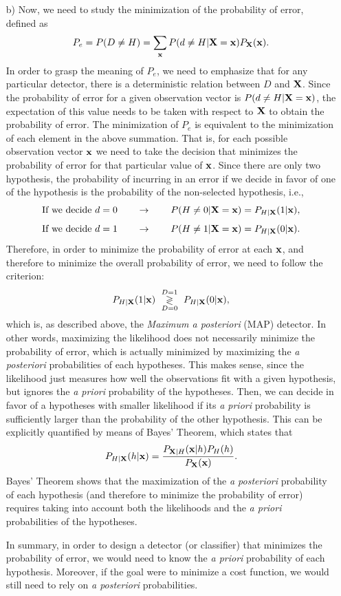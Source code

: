 \begin{solution}
\begin{itemize}
		\item[b)] Now, we need to study the minimization of the probability of error, defined as
		$$P_e = P(D\neq H) = \sum_{\bf x} P(d\neq H | {\bf X}={\bf x}) P_{\bf X}({\bf x}).$$
		In order to grasp the meaning of $P_e$, we need to emphasize that for any particular detector, there is a deterministic relation between $D$ and ${\bf X}$. Since the probability of error for a given observation vector is $P(d\neq H | {\bf X}={\bf x})$, the expectation of this value needs to be taken with respect to ${\bf X}$ to obtain the probability of error. The minimization of $P_e$ is equivalent to the minimization of each element in the above summation. That is, for each possible observation vector ${\bf x}$ we need to take the decision that minimizes the probability of error for that particular value of ${\bf x}$. Since there are only two hypothesis, the probability of incurring in an error if we decide in favor of one of the hypothesis is the probability of the non-selected hypothesis, i.e.,
		$$\text{If we decide } d=0 \qquad \rightarrow \qquad  P(H \neq 0 | {\bf X}={\bf x}) = P_{H|{\bf X}}(1|{\bf x}),$$
		$$\text{If we decide } d=1 \qquad \rightarrow \qquad  P(H\neq 1 | {\bf X}={\bf x}) = P_{H|{\bf X}}(0|{\bf x}).$$
		Therefore, in order to minimize the probability of error at each ${\bf x}$, and therefore to minimize the overall probability of error, we need to follow the criterion:
		$$P_{H|{\bf X}}(1|{\bf x}) \,\, \underset{D=0}{\overset{D=1}{\gtrless}}\,\, P_{H|{\bf X}}(0|{\bf x}),$$
		which is, as described above, the {\em Maximum a posteriori} (MAP) detector. In other words, maximizing the likelihood does not necessarily minimize the probability of error, which is actually minimized by maximizing the {\em a posteriori} probabilities of each hypotheses. This makes sense, since the likelihood just measures how well the observations fit with a given hypothesis, but ignores the {\em a priori} probability of the hypotheses. Then, we can  decide in favor of a hypotheses with smaller likelihood if its {\em a priori} probability is sufficiently larger than the probability of the other hypothesis. This can be explicitly quantified by means of Bayes' Theorem, which states that
		$$P_{H|{\bf X}}(h|{\bf x}) = \frac{P_{{\bf X}|H}({\bf x}|h) P_{H}(h)}{P_{\bf X}({\bf x})}.$$
		Bayes' Theorem shows that the maximization of  the {\em a posteriori} probability of each hypothesis (and therefore to minimize the probability of error) requires taking into account both the likelihoods and the {\em a priori} probabilities of the hypotheses.
		
		In summary, in order to design a detector (or classifier) that minimizes the probability of error, we would need to know the {\em a priori} probability of each hypothesis. Moreover, if the goal were to minimize a cost function, we would still need to rely on {\em a posteriori} probabilities.
		
	\end{itemize}
	
\end{solution}

